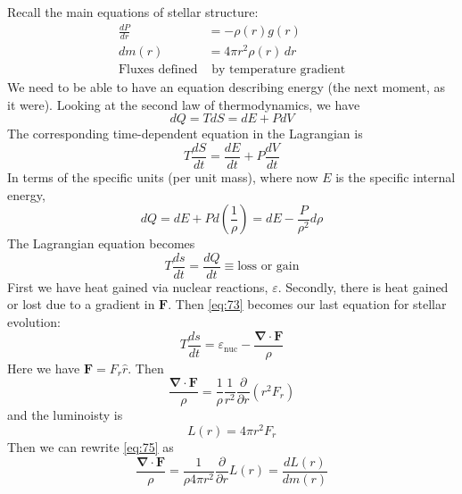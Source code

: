 \documentclass[10pt]{article}
\numberwithin{equation}{section}
\begin{document}
  Recall the main equations of stellar structure:
  \begin{align}
    \label{eq:69}
    \frac{dP}{dr}&=-\rho(r)g(r)\\
    dm(r)&=4\pi r^2\rho(r)\,dr\\
    \nonumber\textrm{Fluxes defined}&\textrm{ by temperature gradient}
  \end{align}
  We need to be able to have an equation describing energy (the next
  moment, as it were). Looking at the second law of thermodynamics, we
  have
  \begin{equation}
    \label{eq:70}
    dQ=TdS=dE+PdV
  \end{equation}
  The corresponding time-dependent equation in the Lagrangian is
  \begin{equation}
    \label{eq:71}
    T\frac{dS}{dt}=\frac{dE}{dt}+P\frac{dV}{dt}
  \end{equation}
  In terms of the specific units (per unit mass), where now $E$ is the
  specific internal energy,
  \begin{equation}
    \label{eq:72}
    dQ=dE+Pd\left(\frac{1}{\rho}\right)=dE-\frac{P}{\rho^2}d\rho
  \end{equation}
  The Lagrangian equation becomes
  \begin{equation}
    \label{eq:73}
    T\frac{ds}{dt}=\frac{dQ}{dt}\equiv\textrm{loss or gain}
  \end{equation}
  First we have heat gained via nuclear reactions,
  $\varepsilon$. Secondly, there is heat gained or lost due to a
  gradient in $\mathbf{F}$. Then \eqref{eq:73} becomes our last equation
  for stellar evolution:
  \begin{equation}
    \label{eq:74}
    \boxed{T\frac{ds}{dt}=\varepsilon_{\mathrm{nuc}}-\frac{\bm{\nabla}\cdot\mathbf{F}}{\rho}}
  \end{equation}
  Here we have $\mathbf{F}=F_r\hat{r}$. Then
  \begin{equation}
    \label{eq:75}
    \frac{\bm{\nabla}\cdot\mathbf{F}}{\rho}=\frac{1}{\rho}\frac{1}{r^2}\frac{\partial}{\partial
      r}\left(r^2F_r\right)
  \end{equation}
  and the luminoisty is
  \begin{equation}
    \label{eq:76}
    L(r)=4\pi r^2F_r
  \end{equation}
  Then we can rewrite \eqref{eq:75} as
  \begin{equation}
    \label{eq:77}
    \frac{\bm{\nabla}\cdot\mathbf{F}}{\rho}=\frac{1}{\rho4\pi
      r^2}\frac{\partial}{\partial r}L(r)=\frac{d L(r)}{dm(r)}
  \end{equation}
\end{document}
